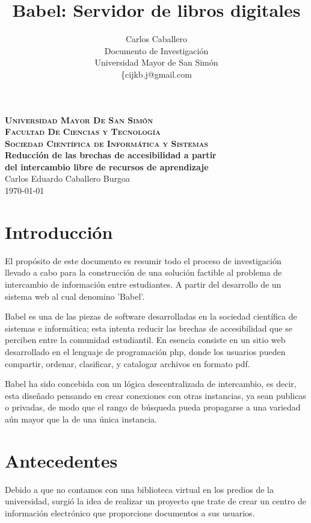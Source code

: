 \documentclass[letter,11pt,oneside,spanish]{article}
\title{\textbf{Babel: Servidor de libros digitales}}
\author{Carlos Caballero\\
        Documento de Investigación\\
        Universidad Mayor de San Simón\\
	\{cijkb.j@gmail.com\\}
\date{}
\begin{document}
\begin{titlepage}
\thispagestyle{empty}
\begin{center}
\large{\textsc{\bf Universidad Mayor De San Simón}}\\
\large{\textsc{\bf Facultad De Ciencias y Tecnología}}\\
\large{\textsc{\bf Sociedad Científica de Informática y Sistemas}}\\
\vspace{4.0cm}
\large{\bf Reducción de las brechas de accesibilidad a partir\\
del intercambio libre de recursos de aprendizaje}\\
\vspace{1.0cm}
\small{Carlos Eduardo Caballero Burgoa}
~\\
\small{\today}
\end{center}
\end{titlepage}

\newpage
\tableofcontents

\newpage
\section{Introducción}
El propósito de este documento es resumir todo el proceso de investigación
llevado a cabo para la construcción de una solución factible al problema de
intercambio de información entre estudiantes. A partir del desarrollo de un
sistema web al cual denomino 'Babel'.

Babel es una de las piezas de software desarrolladas en la sociedad científica
de sistemas e informática; esta intenta reducir las brechas de accesibilidad que
se perciben entre la comunidad estudiantil. En esencia consiste en un sitio web
desarrollado en el lenguaje de programación php, donde los usuarios pueden
compartir, ordenar, clasificar, y catalogar archivos en formato pdf.

Babel ha sido concebida con un lógica descentralizada de intercambio, es
decir, esta diseñado pensando en crear conexiones con otras instancias, ya sean
publicas o privadas, de modo que el rango de búsqueda pueda propagarse a una
variedad aún mayor que la de una única instancia.

\section{Antecedentes}
Debido a que no contamos con una biblioteca virtual en los predios de la universidad, surgió la
idea de realizar un proyecto que trate de crear un centro de información electrónico que 
proporcione documentos a sus usuarios.
\end{document}
